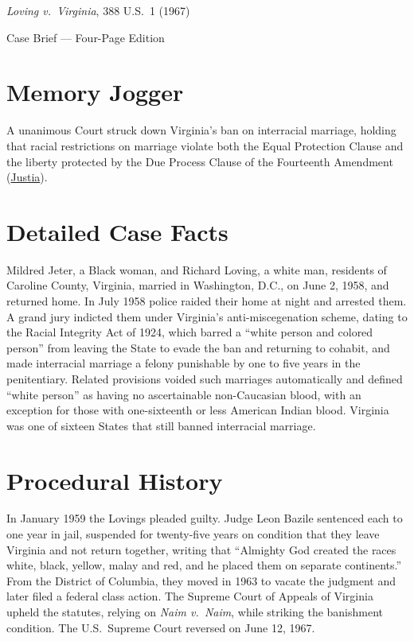 \documentclass[12pt]{article}
\begin{document}
\begin{center}
{\LARGE \textit{Loving v.\ Virginia}, 388 U.S.\ 1 (1967)\par}
\vspace{0.8em}
{\large Case Brief --- Four-Page Edition\par}
\end{center}
\vspace{1em}

\section{Memory Jogger}

A unanimous Court struck down Virginia's ban on interracial marriage, holding that racial restrictions on marriage violate both the Equal Protection Clause and the liberty protected by the Due Process Clause of the Fourteenth Amendment (\href{https://supreme.justia.com/cases/federal/us/388/1/}{Justia}).

\section{Detailed Case Facts}

Mildred Jeter, a Black woman, and Richard Loving, a white man, residents of Caroline County, Virginia, married in Washington, D.C., on June 2, 1958, and returned home. In July 1958 police raided their home at night and arrested them. A grand jury indicted them under Virginia's anti-miscegenation scheme, dating to the Racial Integrity Act of 1924, which barred a ``white person and colored person'' from leaving the State to evade the ban and returning to cohabit, and made interracial marriage a felony punishable by one to five years in the penitentiary. Related provisions voided such marriages automatically and defined ``white person'' as having no ascertainable non-Caucasian blood, with an exception for those with one-sixteenth or less American Indian blood. Virginia was one of sixteen States that still banned interracial marriage.

\section{Procedural History}

In January 1959 the Lovings pleaded guilty. Judge Leon Bazile sentenced each to one year in jail, suspended for twenty-five years on condition that they leave Virginia and not return together, writing that ``Almighty God created the races white, black, yellow, malay and red, and he placed them on separate continents.'' From the District of Columbia, they moved in 1963 to vacate the judgment and later filed a federal class action. The Supreme Court of Appeals of Virginia upheld the statutes, relying on \textit{Naim v.\ Naim}, while striking the banishment condition. The U.S.\ Supreme Court reversed on June 12, 1967.
\end{document}
